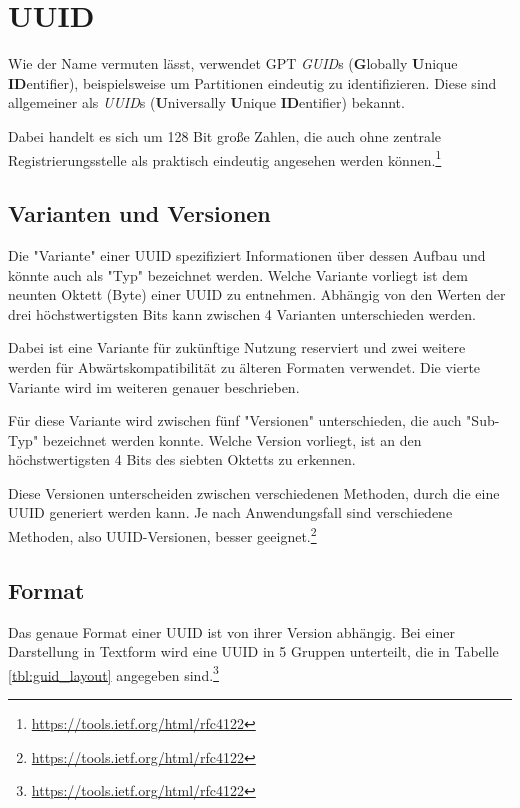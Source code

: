\section{UUID}

Wie der Name vermuten lässt, verwendet GPT \textit{GUID}s (\textbf{G}lobally \textbf{U}nique \textbf{ID}entifier), beispielsweise um Partitionen eindeutig zu identifizieren.
Diese sind allgemeiner als \textit{UUID}s (\textbf{U}niversally \textbf{U}nique \textbf{ID}entifier) bekannt. 

Dabei handelt es sich um 128 Bit große Zahlen, die auch ohne zentrale Registrierungsstelle als praktisch eindeutig angesehen werden können.\footnote{\url{https://tools.ietf.org/html/rfc4122}}

\subsection{Varianten und Versionen}
\label{sec:guid:variants}

Die "Variante" einer UUID spezifiziert Informationen über dessen Aufbau und könnte auch als "Typ" bezeichnet werden.
Welche Variante vorliegt ist dem neunten Oktett (Byte) einer UUID zu entnehmen.
Abhängig von den Werten der drei höchstwertigsten Bits kann zwischen 4 Varianten unterschieden werden.

Dabei ist eine Variante für zukünftige Nutzung reserviert und zwei weitere werden für Abwärtskompatibilität zu älteren Formaten verwendet. 
Die vierte Variante wird im weiteren genauer beschrieben.

Für diese Variante wird zwischen fünf "Versionen" unterschieden, die auch "Sub-Typ" bezeichnet werden konnte.
Welche Version vorliegt, ist an den höchstwertigsten 4 Bits des siebten Oktetts zu erkennen.

Diese Versionen unterscheiden zwischen verschiedenen Methoden, durch die eine UUID generiert werden kann.
Je nach Anwendungsfall sind verschiedene Methoden, also UUID-Versionen, besser geeignet.\footnote{\url{https://tools.ietf.org/html/rfc4122}}


\subsection{Format}
\label{sec:guid:format}

Das genaue Format einer UUID ist von ihrer Version abhängig.
Bei einer Darstellung in Textform wird eine UUID in 5 Gruppen unterteilt, die in Tabelle \ref{tbl:guid_layout} angegeben sind.\footnote{\url{https://tools.ietf.org/html/rfc4122}}

